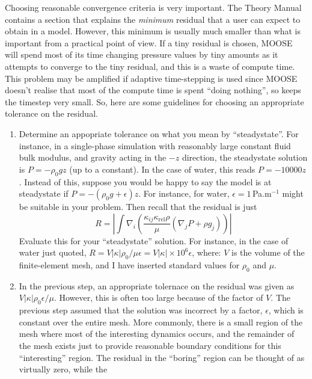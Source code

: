 \documentclass[]{scrreprt}
\begin{document}
Choosing reasonable convergence criteria is very important.  The
Theory Manual contains a section that explains the {\em minimum}
residual that a user can expect to obtain in a model.  However, this
minimum is usually much smaller than what is important from a
practical point of view.  If a tiny residual is chosen, MOOSE will
spend most of its time changing pressure values by tiny amounts as it
attempts to converge to the tiny residual, and this is a waste of
compute time.   This problem may be amplified if adaptive time-stepping is
used since MOOSE doesn't realise that most of the compute time is
spent ``doing nothing'', so keeps the timestep very small.  So, here
are some guidelines for choosing an appropriate tolerance on the
residual.
\begin{enumerate}
\item Determine an appopriate tolerance on what you mean by
  ``steadystate''.  For instance, in a single-phase simulation with
  reasonably large constant fluid bulk modulus, and gravity acting in
  the $-z$ direction, the steadystate solution is $P = -\rho_{0}gz$
  (up to a constant).  In the case of water, this reads $P=-10000z$.
  Instead of this, suppose you would be happy to say the model is at
  steadystate if $P = -(\rho_{0} g + \epsilon)z$.  For instance, for water,
  $\epsilon=1$\,Pa.m$^{-1}$ might be suitable in your problem.  Then recall
  that the residual is just
\begin{equation}
R = \left|\int
\nabla_{i}\left(\frac{\kappa_{ij}\kappa_{\mathrm{rel}}\rho}{\mu}(\nabla_{j}P
+ \rho g_{j}) \right) \right|
\label{eqn.res.int}
\end{equation}
Evaluate this for your ``steadystate'' solution.  For instance, in the
case of water just quoted, $R = V|\kappa|\rho_{0}/\mu\epsilon =
V|\kappa|\times 10^{6}\epsilon$, where: $V$ is the volume of the
finite-element mesh, and I have inserted standard values for
$\rho_{0}$ and $\mu$.
\item In the previous step, an appropriate tolernace on the residual
  was given as $V|\kappa|\rho_{0}\epsilon/\mu$.  However, this is often too
  large because of the factor of $V$.  The previous step assumed that
  the solution was incorrect by a factor, $\epsilon$, which is constant
  over the entire mesh.   More commonly, there is a small region of
  the mesh where most of the interesting dynamics occurs, and the
  remainder of the mesh exists just to provide reasonable boundary
  conditions for this ``interesting'' region.  The residual in the
  ``boring'' region can be thought of as virtually zero, while the

\end{enumerate}
\end{document}
